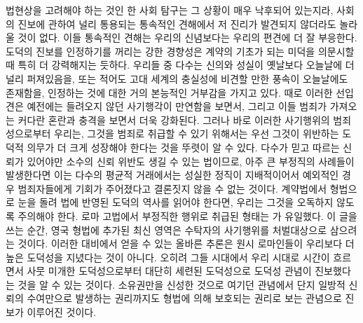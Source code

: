 법현상을 고려해야 하는 것인 한
사회 탐구는 그 상황이 매우 낙후되어 있는지라,
사회의 진보에 관하여 널리 통용되는
통속적인 견해에서 저 진리가
발견되지 않더라도 놀라울 것이 없다.
이들 통속적인 견해는
우리의 신념보다는 우리의 편견에 더 잘 부응한다.
도덕의 진보를 인정하기를 꺼리는 강한 경향성은
계약의 기초가 되는 미덕을 의문시할 때
특히 더 강력해지는 듯하다.
우리들 중 다수는
신의와 성실이 옛날보다 오늘날에 더 널리 퍼져있음을,
또는 적어도 고대 세계의 충실성에 비견할 만한 풍속이 오늘날에도 존재함을,
인정하는 것에 대한
거의 본능적인 거부감을 가지고 있다.
때로 이러한 선입견은
예전에는 들려오지 않던
사기행각이 만연함을 보면서,
그리고 이들 범죄가 가져오는 커다란 혼란과 충격을 보면서
더욱 강화된다.
그러나 바로 이러한 사기행위의 범죄성으로부터 우리는,
그것을 범죄로 취급할 수 있기 위해서는
우선
그것이 위반하는 도덕적 의무가 더 크게 성장해야 한다는 것을
뚜렷이 알 수 있다.
다수가 믿고 따르는 신뢰가 있어야만
소수의 신뢰 위반도 생길 수 있는 법이므로,
아주 큰 부정직의 사례들이 발생한다면 이는
다수의 평균적 거래에서는 성실한 정직이 지배적이어서
예외적인 경우 범죄자들에게 기회가 주어졌다고
결론짓지 않을 수 없는 것이다.
계약법에서 형법으로 눈을 돌려
법에 반영된 도덕의 역사를 읽어야 한다면,
우리는 그것을 오독하지 않도록 주의해야 한다.
로마 고법에서 부정직한 행위로 취급된 형태는
가 유일했다.
이 글을 쓰는 순간,
영국 형법에 추가된 최신 영역은
수탁자의 사기행위를 처벌대상으로 삼으려는 것이다.
이러한 대비에서 얻을 수 있는 올바른 추론은
원시 로마인들이 우리보다 더 높은 도덕성을 지녔다는 것이 아니다.
오히려 그들 시대에서 우리 시대로 시간이 흐르면서
사뭇 미개한 도덕성으로부터 대단히 세련된 도덕성으로
도덕성 관념이 진보했다는 것을 알 수 있는 것이다.
소유권만을 신성한 것으로 여기던 관념에서
단지 일방적 신뢰의 수여만으로 발생하는 권리까지도
형법에 의해 보호되는 권리로 보는 관념으로 진보가 이루어진 것이다.

